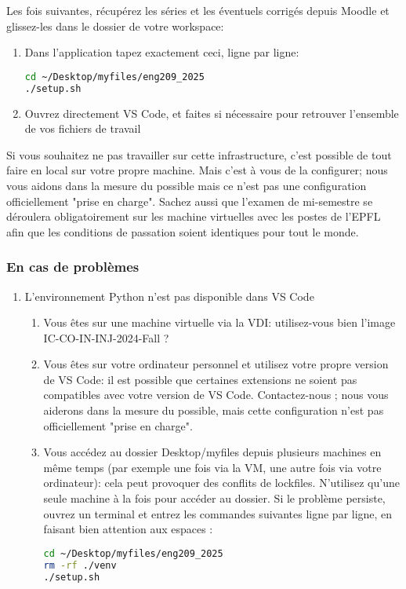 \documentclass[10pt]{article}
\begin{document}
Les fois suivantes, récupérez les séries et les éventuels corrigés depuis Moodle et glissez-les dans le dossier de votre workspace:

\begin{enumerate}
\item Dans l'application  tapez exactement ceci, ligne par ligne:
\\
\begin{lstlisting}[language=Bash]
cd ~/Desktop/myfiles/eng209_2025
./setup.sh
\end{lstlisting}

\item Ouvrez directement VS Code, et faites  si nécessaire pour retrouver l'ensemble de vos fichiers de travail
\end{enumerate}

Si vous souhaitez ne pas travailler sur cette infrastructure, c'est possible de tout faire en local sur votre propre machine. Mais c'est à vous de la configurer; nous vous aidons dans la mesure du possible mais ce n'est pas une configuration officiellement "prise en charge". Sachez aussi que l'examen de mi-semestre se déroulera obligatoirement sur les machine virtuelles avec les postes de l'EPFL afin que les conditions de passation soient identiques pour tout le monde.

\subsubsection*{En cas de problèmes}

\begin{enumerate}
\item L’environnement Python n’est pas disponible dans VS Code
\begin{enumerate} 
\item Vous êtes sur une machine virtuelle via la VDI: utilisez-vous bien l’image IC-CO-IN-INJ-2024-Fall ?
\item Vous êtes sur votre ordinateur personnel et utilisez votre propre version de VS Code: il est possible que certaines extensions ne soient pas compatibles avec votre version de VS Code. Contactez-nous ; nous vous aiderons dans la mesure du possible, mais cette configuration n’est pas officiellement "prise en charge".
\item Vous accédez au dossier Desktop/myfiles depuis plusieurs machines en même temps (par exemple une fois via la VM, une autre fois via votre ordinateur): cela peut provoquer des conflits de lockfiles. N’utilisez qu’une seule machine à la fois pour accéder au dossier.
Si le problème persiste, ouvrez un terminal et entrez les commandes suivantes ligne par ligne, en faisant bien attention aux espaces :
\begin{lstlisting}[language=Bash]
cd ~/Desktop/myfiles/eng209_2025
rm -rf ./venv
./setup.sh
\end{lstlisting}
\end{enumerate}
\end{enumerate}
\end{document}
